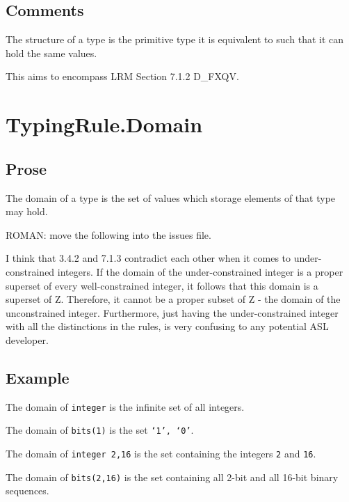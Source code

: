 \documentclass{book}
\begin{document}
\begin{emptyformal}
\end{emptyformal}
    \subsection{Comments}
    The structure of a type is the primitive type it is equivalent to such that
    it can hold the same values.

    This aims to encompass LRM Section 7.1.2 D\_FXQV.

\section{TypingRule.Domain}

  \subsection{Prose}
  The domain of a type is the set of values which storage elements of that type
may hold.

\begin{emptytodo}
ROMAN: explain where this is used. For example, for static evaluation of expressions.}
\end{emptytodo}

\begin{emptytodo}
ROMAN: move the following into the issues file.

I think that 3.4.2 and 7.1.3 contradict each other when it comes to under-constrained integers. If the domain of the under-constrained integer is a proper superset of every well-constrained integer, it follows that this domain is a superset of Z. Therefore, it cannot be a proper subset of Z - the domain of the unconstrained integer. Furthermore, just having the under-constrained integer with all the distinctions in the rules, is very confusing to any potential ASL developer.
\end{emptytodo}

  \subsection{Example}
  The domain of \texttt{integer} is the infinite set of all integers.

  The domain of \texttt{bits(1)} is the set \texttt{{‘1’, ‘0’}}.

  The domain of \texttt{integer {2,16}} is the set containing the integers \texttt{2} and \texttt{16}.

  The domain of \texttt{bits({2,16})} is the set containing all 2-bit and all 16-bit binary sequences.
\end{document}

